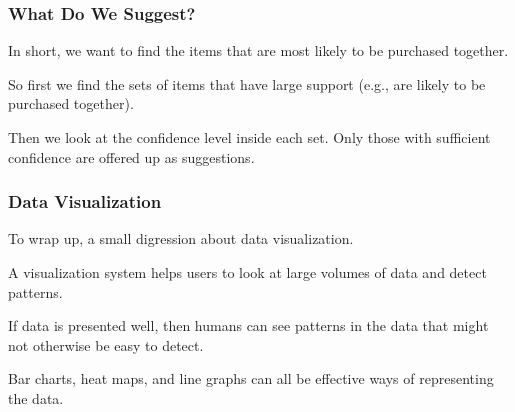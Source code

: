 \begin{frame}
\frametitle{What Do We Suggest?}

In short, we want to find the items that are most likely to be purchased together. 

So first we find the sets of items that have large support (e.g., are likely to be purchased together). 

Then we look at the confidence level inside each set. Only those with sufficient confidence are offered up as suggestions. 

\end{frame}

\begin{frame}
\frametitle{Data Visualization}

To wrap up, a small digression about data visualization. 

A visualization system helps users to look at large volumes of data and detect patterns. 

If data is presented well, then humans can see patterns in the data that might not otherwise be easy to detect. 

Bar charts, heat maps, and line graphs can all be effective ways of representing the data.

\end{frame}






